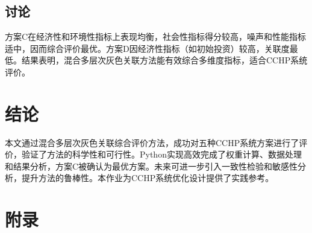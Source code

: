 \documentclass[12pt]{article}
\begin{document}
\subsection{讨论}
方案C在经济性和环境性指标上表现均衡，社会性指标得分较高，噪声和性能指标适中，因而综合评价最优。方案D因经济性指标（如初始投资）较高，关联度最低。结果表明，混合多层次灰色关联方法能有效综合多维度指标，适合CCHP系统评价。

\section{结论}
本文通过混合多层次灰色关联综合评价方法，成功对五种CCHP系统方案进行了评价，验证了方法的科学性和可行性。Python实现高效完成了权重计算、数据处理和结果分析，方案C被确认为最优方案。未来可进一步引入一致性检验和敏感性分析，提升方法的鲁棒性。本作业为CCHP系统优化设计提供了实践参考。




\section{附录}
\end{document}
